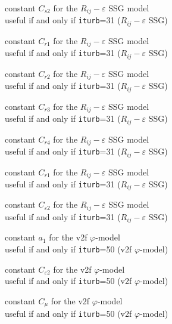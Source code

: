 {constant $C_{s2}$ for the $R_{ij}-\varepsilon$ SSG model\\
useful if and only if {\tt iturb}=31
($R_{ij}-\varepsilon$ SSG)}

{constant $C_{r1}$ for the $R_{ij}-\varepsilon$ SSG model\\
useful if and only if {\tt iturb}=31
($R_{ij}-\varepsilon$ SSG)}

{constant $C_{r2}$ for the $R_{ij}-\varepsilon$ SSG model\\
useful if and only if {\tt iturb}=31
($R_{ij}-\varepsilon$ SSG)}

{constant $C_{r3}$ for the $R_{ij}-\varepsilon$ SSG model\\
useful if and only if {\tt iturb}=31
($R_{ij}-\varepsilon$ SSG)}

{constant $C_{r4}$ for the $R_{ij}-\varepsilon$ SSG model\\
useful if and only if {\tt iturb}=31
($R_{ij}-\varepsilon$ SSG)}

{constant $C_{r1}$ for the $R_{ij}-\varepsilon$ SSG model\\
useful if and only if {\tt iturb}=31
($R_{ij}-\varepsilon$ SSG)}

{constant $C_{\varepsilon 2}$ for the $R_{ij}-\varepsilon$ SSG model\\
useful if and only if {\tt iturb}=31
($R_{ij}-\varepsilon$ SSG)}


{constant $a_1$ for the v2f $\varphi$-model\\
useful if and only if {\tt iturb}=50
(v2f $\varphi$-model)}

{constant $C_{\varepsilon 2}$ for the v2f $\varphi$-model\\
useful if and only if {\tt iturb}=50
(v2f $\varphi$-model)}

{constant $C_\mu$ for the v2f $\varphi$-model\\
useful if and only if {\tt iturb}=50
(v2f $\varphi$-model)}

